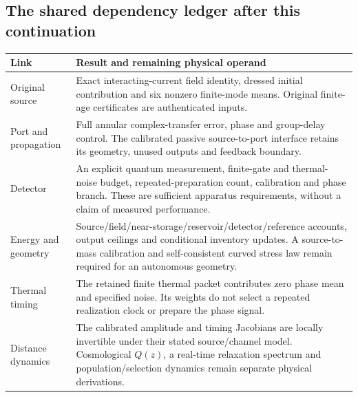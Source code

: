 \documentclass[10pt,twocolumn,letterpaper]{article}
\begin{document}
\subsection{The shared dependency ledger after this continuation}
\begin{center}\small
\begin{tabularx}{\columnwidth}{@{}p{}X@{}}\toprule
Link & Result and remaining physical operand\\\midrule
Original source & Exact interacting-current field identity, dressed initial contribution and six nonzero finite-mode means. Original finite-age certificates are authenticated inputs.\\
Port and propagation & Full annular complex-transfer error, phase and group-delay control. The calibrated passive source-to-port interface retains its geometry, unused outputs and feedback boundary.\\
Detector & An explicit quantum measurement, finite-gate and thermal-noise budget, repeated-preparation count, calibration and phase branch. These are sufficient apparatus requirements, without a claim of measured performance.\\
Energy and geometry & Source/field/near-storage/reservoir/detector/reference accounts, output ceilings and conditional inventory updates. A source-to-mass calibration and self-consistent curved stress law remain required for an autonomous geometry.\\
Thermal timing & The retained finite thermal packet contributes zero phase mean and specified noise. Its weights do not select a repeated realization clock or prepare the phase signal.\\
Distance dynamics & The calibrated amplitude and timing Jacobians are locally invertible under their stated source/channel model. Cosmological $Q(z)$, a real-time relaxation spectrum and population/selection dynamics remain separate physical derivations.\\\bottomrule
\end{tabularx}\end{center}
\end{document}
